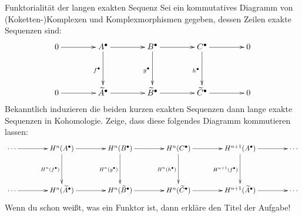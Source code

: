 \documentclass{uebblatt}
\begin{document}

\begin{aufgabe}{Funktorialität der langen exakten Sequenz}
Sei ein kommutatives Diagramm von (Koketten-)Komplexen und Komplexmorphismen gegeben,
dessen Zeilen exakte Sequenzen sind:
\[ \xymatrixcolsep{3.5pc}\xymatrixrowsep{3.5pc}\xymatrix{
  0 \ar[r]
    & A^\bullet \ar[r] \ar[d]_{f^\bullet}
    & B^\bullet \ar[r] \ar[d]_{g^\bullet}
    & C^\bullet \ar[r] \ar[d]_{h^\bullet}
    & 0 \\
  0 \ar[r]
    & \widetilde A^\bullet \ar[r]
    & \widetilde B^\bullet \ar[r]
    & \widetilde C^\bullet \ar[r]
    & 0
} \]
Bekanntlich induzieren die beiden kurzen exakten Sequenzen dann lange exakte
Sequenzen in Kohomologie. Zeige, dass diese folgendes Diagramm kommutieren
lassen:
\[ \xymatrixcolsep{3.5pc}\xymatrixrowsep{3.5pc}\xymatrix{
  \cdots \ar[r]
    & H^n(A^\bullet) \ar[r] \ar[d]_{H^n(f^\bullet)}
    & H^n(B^\bullet) \ar[r] \ar[d]_{H^n(g^\bullet)}
    & H^n(C^\bullet) \ar[r] \ar[d]_{H^n(h^\bullet)}
    & H^{n+1}(A^\bullet) \ar[r] \ar[d]_{H^{n+1}(f^\bullet)}
    & \cdots \\
  \cdots \ar[r]
    & H^n(\widetilde A^\bullet) \ar[r]
    & H^n(\widetilde B^\bullet) \ar[r]
    & H^n(\widetilde C^\bullet) \ar[r]
    & H^{n+1}(\widetilde A^\bullet) \ar[r]
    & \cdots
} \]
Wenn du schon weißt, was ein Funktor ist, dann erkläre den Titel der Aufgabe!
\end{aufgabe}
\end{document}
